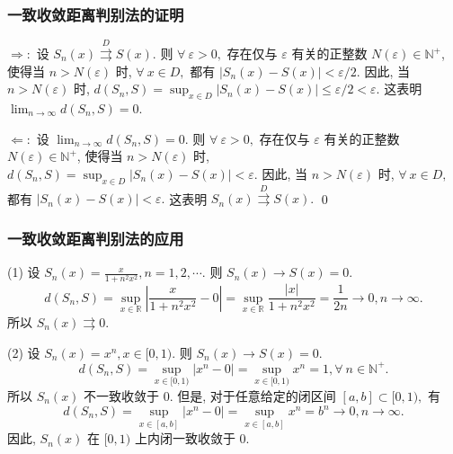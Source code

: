 \begin{frame}
\frametitle{一致收敛距离判别法的证明}

$\Longrightarrow:$ 设 $S_n(x) \stackrel{D}{\rightrightarrows} S(x).$ 则 $\forall ~ \varepsilon > 0,$ 存在仅与 $\varepsilon$ 有关的正整数 $N(\varepsilon) \in \mathbb{N}^+$, 使得当 $n > N(\varepsilon)$ 时, $\forall ~ x \in D,$ 都有 $|S_n(x) - S(x)| < \varepsilon/2.$ 因此, 当 $n > N(\varepsilon)$ 时, $d(S_n, S) = \sup_{x \in D} |S_n(x) - S(x)| \leqslant \varepsilon/2 < \varepsilon.$ 这表明 $\lim_{n \to \infty} d(S_n, S) = 0.$

\pause
\vspace{1em}

$\Longleftarrow:$ 设 $\lim_{n \to \infty} d(S_n, S) = 0.$ 则 $\forall ~ \varepsilon > 0,$ 存在仅与 $\varepsilon$ 有关的正整数 $N(\varepsilon) \in \mathbb{N}^+$, 使得当 $n > N(\varepsilon)$ 时, $d(S_n, S) = \sup_{x \in D} |S_n(x) - S(x)| < \varepsilon.$ 因此, 当 $n > N(\varepsilon)$ 时, $\forall ~ x \in D,$ 都有 $|S_n(x) - S(x)| < \varepsilon.$ 这表明 $S_n(x) \stackrel{D}{\rightrightarrows} S(x).$
\qed

\end{frame}


\begin{frame}
\frametitle{一致收敛距离判别法的应用}

(1) 设 $S_n(x) = \frac{x}{1 + n^2 x^2}, n = 1, 2, \cdots.$ 则 $S_n(x) \rightarrow S(x) = 0.$
\[
d(S_n, S) = \sup_{x \in \mathbb{R}} \left| \frac{x}{1 + n^2 x^2} - 0 \right| = \sup_{x \in \mathbb{R}} \frac{|x|}{1 + n^2 x^2} = \frac{1}{2n} \to 0, n \to \infty.
\]
所以 $S_n(x) \rightrightarrows 0.$

\pause
\vspace{1em}

(2) 设 $S_n(x) = x^n, x \in [0, 1).$ 则 $S_n(x) \rightarrow S(x) = 0.$
\[
d(S_n, S) = \sup_{x \in [0, 1)} |x^n - 0| = \sup_{x \in [0, 1)} x^n = 1, \forall ~ n \in \mathbb{N}^+.
\]
所以 $S_n(x)$ 不一致收敛于 $0.$ \pause 但是, 对于任意给定的闭区间 $[a, b] \subset [0, 1),$ 有
\[
d(S_n, S) = \sup_{x \in [a, b]} |x^n - 0| = \sup_{x \in [a, b]} x^n = b^n \to 0, n \to \infty.
\]
因此, $S_n(x)$ 在 $[0, 1)$ 上内闭一致收敛于 $0.$

\end{frame}


